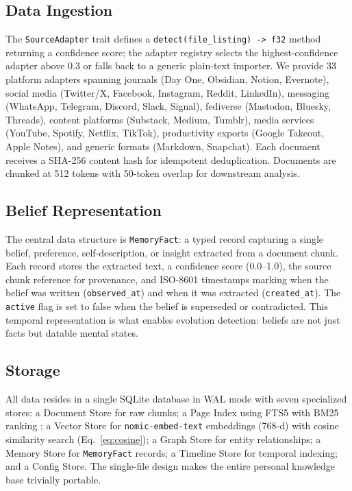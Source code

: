 \documentclass[pdflatex,sn-mathphys-num]{sn-jnl}
\begin{document}
\subsection{Data Ingestion}

The \texttt{SourceAdapter} trait defines a \texttt{detect(file\_listing) -> f32} method returning a confidence score; the adapter registry selects the highest-confidence adapter above 0.3 or falls back to a generic plain-text importer. We provide 33 platform adapters spanning journals (Day One, Obsidian, Notion, Evernote), social media (Twitter/X, Facebook, Instagram, Reddit, LinkedIn), messaging (WhatsApp, Telegram, Discord, Slack, Signal), fediverse (Mastodon, Bluesky, Threads), content platforms (Substack, Medium, Tumblr), media services (YouTube, Spotify, Netflix, TikTok), productivity exports (Google Takeout, Apple Notes), and generic formats (Markdown, Snapchat). Each document receives a SHA-256 content hash for idempotent deduplication. Documents are chunked at 512 tokens with 50-token overlap for downstream analysis.

\subsection{Belief Representation}

The central data structure is \texttt{MemoryFact}: a typed record capturing a single belief, preference, self-description, or insight extracted from a document chunk. Each record stores the extracted text, a confidence score (0.0--1.0), the source chunk reference for provenance, and ISO-8601 timestamps marking when the belief was written (\texttt{observed\_at}) and when it was extracted (\texttt{created\_at}). The \texttt{active} flag is set to false when the belief is superseded or contradicted. This temporal representation is what enables evolution detection: beliefs are not just facts but datable mental states.

\subsection{Storage}

All data resides in a single SQLite database in WAL mode with seven specialized stores: a Document Store for raw chunks; a Page Index using FTS5 \cite{sqlite2023fts5} with BM25 ranking \cite{robertson2009bm25}; a Vector Store for \texttt{nomic-embed-text} \cite{nussbaum2024nomic} embeddings (768-d) with cosine similarity search (Eq.~\ref{eq:cosine}); a Graph Store for entity relationships; a Memory Store for \texttt{MemoryFact} records; a Timeline Store for temporal indexing; and a Config Store. The single-file design makes the entire personal knowledge base trivially portable.
\end{document}
